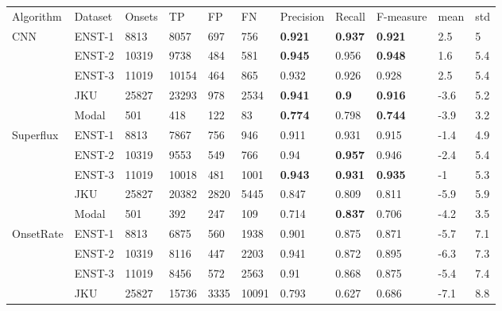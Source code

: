 {\begin{table}
	\begin{threeparttable} 
		\begin{centering}
			\begin{tabular}{l l l l l l l l l l l}
				\tabletop
Algorithm & Dataset & Onsets & TP    & FP   & FN    & Precision & Recall & F-measure & mean & std \\
				\tablemid			
CNN       & ENST-1  & 8813   & 8057  & 697  & 756   & \textbf{0.921}     & \textbf{0.937}  & \textbf{0.921}     & 2.5  & 5   \\
          & ENST-2  & 10319  & 9738  & 484  & 581   & \textbf{0.945}     & 0.956  & \textbf{0.948}     & 1.6  & 5.4 \\
          & ENST-3  & 11019  & 10154 & 464  & 865   & 0.932     & 0.926  & 0.928     & 2.5  & 5.4 \\
          & JKU     & 25827  & 23293 & 978  & 2534  & \textbf{0.941  }   & \textbf{0.9}    & \textbf{0.916}     & -3.6 & 5.2 \\
          & Modal   & 501    & 418   & 122  & 83    & \textbf{0.774}     & 0.798  & \textbf{0.744}     & -3.9 & 3.2 \\
          \hdashline
Superflux & ENST-1  & 8813   & 7867  & 756  & 946   & 0.911     & 0.931  & 0.915     & -1.4 & 4.9 \\
          & ENST-2  & 10319  & 9553  & 549  & 766   & 0.94      & \textbf{0.957}  & 0.946     & -2.4 & 5.4 \\
          & ENST-3  & 11019  & 10018 & 481  & 1001  & \textbf{0.943 }    & \textbf{0.931}  & \textbf{0.935}     & -1   & 5.3 \\
          & JKU     & 25827  & 20382 & 2820 & 5445  & 0.847     & 0.809  & 0.811     & -5.9 & 5.9 \\
          & Modal   & 501    & 392   & 247  & 109   & 0.714     & \textbf{0.837}  & 0.706     & -4.2 & 3.5 \\
          \hdashline
OnsetRate & ENST-1  & 8813   & 6875  & 560  & 1938  & 0.901     & 0.875  & 0.871     & -5.7 & 7.1 \\
          & ENST-2  & 10319  & 8116  & 447  & 2203  & 0.941     & 0.872  & 0.895     & -6.3 & 7.3 \\
          & ENST-3  & 11019  & 8456  & 572  & 2563  & 0.91      & 0.868  & 0.875     & -5.4 & 7.4 \\
          & JKU     & 25827  & 15736 & 3335 & 10091 & 0.793     & 0.627  & 0.686     & -7.1 & 8.8 \\

\end{tabular}
\end{centering}
\end{threeparttable}
\end{table}}

